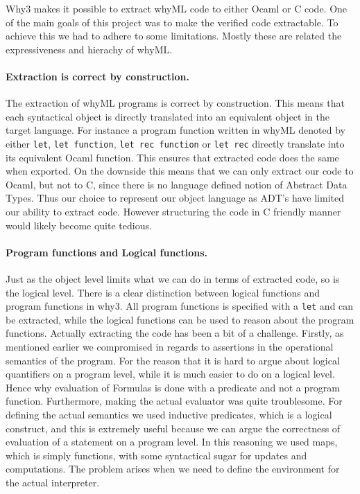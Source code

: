 Why3 makes it possible to extract whyML code to either Ocaml or C code.
One of the main goals of this project was to make the verified code extractable.
To achieve this we had to adhere to some limitations.
Mostly these are related the expressiveness and hierachy of whyML.

\paragraph{Extraction is correct by construction.}
The extraction of whyML programs is correct by construction\cite{TODO : manual for why3}.
This means that each syntactical object is directly translated into an equivalent object
in the target language. For instance a program function written in whyML denoted by either \texttt{let}, \texttt{let function}, \texttt{let rec function} or \texttt{let rec} directly translate into its equivalent Ocaml function. This ensures that extracted code does the same when exported.
On the downside this means that we can only extract our code to Ocaml, but not to C, since there is no
language defined notion of Abstract Data Types.
Thus our choice to represent our object language as ADT's have limited our ability to extract code.
However structuring the code in C friendly manner would likely become quite tedious.

\paragraph{Program functions and Logical functions.}
Just as the object level limits what we can do in terms of extracted code, so is the logical level.
There is a clear distinction between logical functions and program functions in why3.
All program functions is specified with a \texttt{let} and can be extracted,
while the logical functions can be used to reason about the program functions.
Actually extracting the code has been a bit of a challenge.
Firstly, as mentioned earlier we compromised in regards to assertions in the operational semantics of the program. For the reason that it is hard to argue about logical quantifiers on a program level, while it is much easier to do on a logical level. Hence why evaluation of Formulas is done with a predicate and not a program function.
Furthermore, making the actual evaluator was quite troublesome.
For defining the actual semantics we used inductive predicates, which is a logical construct, and this is extremely useful because we can argue the correctness of evaluation of a statement on a program level.
In this reasoning we used maps, which is simply functions, with some syntactical sugar for updates and computations.
The problem arises when we need to define the environment for the actual interpreter.

